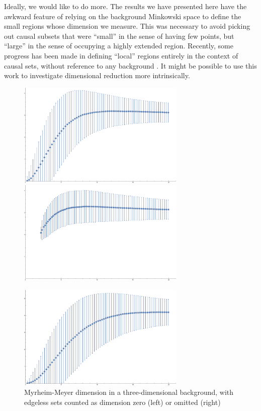 \documentclass[12pt]{article}
\begin{document}
Ideally, we would like to do more.  The results we have presented here have the
awkward feature of relying on the background Minkowski space to define the
small regions whose dimension we measure.  This was necessary to avoid picking
out causal subsets that were ``small'' in the sense of having few points, but
``large'' in the sense of occupying a highly extended region.  Recently, some
progress has been made in defining ``local'' regions entirely in the context of
causal sets, without reference to any background .  It might be
possible to use this work to investigate dimensional reduction more intrinsically.



\begin{figure}
\begin{center}
\includegraphics[width=3.15in]{CSDimRed3D.pdf}
 \includegraphics[width=3.15in]{CSDimRed3D2.pdf}
\caption{Myrheim-Meyer dimension in a three-dimensional background,
with edgeless sets counted as dimension zero (left) or omitted (right) \label{fig2}}
\end{center}
\begin{center}
\includegraphics[width=3.15in]{CSDimRed.pdf}

\end{center}
\end{figure}
\end{document}
